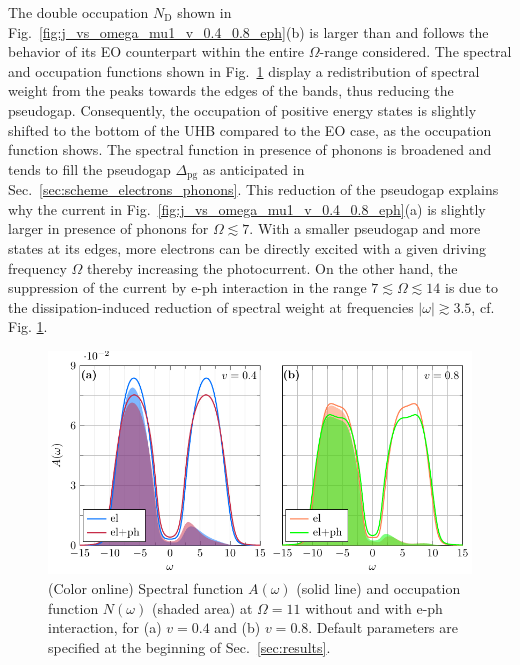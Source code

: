 \documentclass[aps,prb,groupedaddress,showpacs,twocolumn,superscriptaddress,10pt]{revtex4-2}
\begin{document}
The double occupation $N_{\text{D}}$  shown in Fig.~\ref{fig:j_vs_omega_mu1_v_0.4_0.8_eph}(b) is larger than and follows the behavior of its EO counterpart within the entire $\Omega$-range considered.
The spectral and occupation functions  shown in Fig.~\ref{fig:spec_filling_mu1_v_0.4_0.8_O_11_eph} display a redistribution of spectral weight from the peaks towards the edges of the bands, thus reducing the pseudogap. Consequently, the occupation of positive energy states is slightly shifted to the bottom of the UHB compared to the EO case, as the occupation function shows.
 The spectral function in presence of phonons is  broadened and tends to fill the pseudogap $\Delta_{\text{pg}}$ as anticipated in Sec.~\ref{sec:scheme_electrons_phonons}.
This reduction of the pseudogap explains why the current in Fig.~\ref{fig:j_vs_omega_mu1_v_0.4_0.8_eph}(a) is slightly larger in presence of phonons for $\Omega\lesssim7$. %
With a smaller pseudogap and more states at its edges, more electrons can be directly excited with a given driving frequency $\Omega$ thereby increasing the photocurrent. On the other hand, the suppression of the current by e-ph interaction in the range $7\lesssim\Omega\lesssim14$ is due to the dissipation-induced reduction of spectral weight at frequencies $|\omega| \gtrsim 3.5$, cf. Fig. \ref{fig:spec_filling_mu1_v_0.4_0.8_O_11_eph}. 
 
\begin{figure}[b]
\includegraphics[width=\linewidth]{./figures_Paper1/spec_filling_mu1_v_0.4_0.8_O_11_eph.pdf}
\caption{(Color online) Spectral function $A(\omega)$ (solid line) and occupation function $N(\omega)$ (shaded area) at $\Omega=11$ without and with e-ph interaction, for (a) $v=0.4$ and (b) $v=0.8$. Default parameters are specified at the beginning of Sec.~\ref{sec:results}.} 
\label{fig:spec_filling_mu1_v_0.4_0.8_O_11_eph}
\end{figure} 
\end{document}
